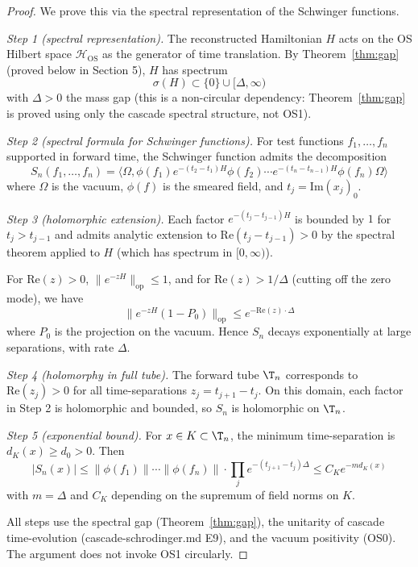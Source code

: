 \documentclass[11pt, a4paper]{amsart}
\theoremstyle{definition}
\newcommand{\HH}{\mathcal{H}}
\begin{document}
\begin{proof}
We prove this via the spectral representation of the Schwinger
functions.

\emph{Step 1 (spectral representation).}
The reconstructed Hamiltonian $H$ acts on the OS Hilbert space
$\HH_{\mathrm{OS}}$ as the generator of time translation.
By Theorem~\ref{thm:gap} (proved below in Section 5), $H$ has
spectrum
\[
\sigma(H) \subset \{0\} \cup [\Delta, \infty)
\]
with $\Delta > 0$ the mass gap (this is a non-circular dependency:
Theorem~\ref{thm:gap} is proved using only the cascade spectral
structure, not OS1).

\emph{Step 2 (spectral formula for Schwinger functions).}
For test functions $f_1, \dots, f_n$ supported in forward time,
the Schwinger function admits the decomposition
\[
S_n(f_1, \dots, f_n) = \langle \Omega, \phi(f_1) e^{-(t_2 - t_1) H} \phi(f_2) \cdots e^{-(t_n - t_{n-1}) H} \phi(f_n) \Omega \rangle
\]
where $\Omega$ is the vacuum, $\phi(f)$ is the smeared field,
and $t_j = \mathrm{Im}(x_j)_0$.

\emph{Step 3 (holomorphic extension).}
Each factor $e^{-(t_j - t_{j-1}) H}$ is bounded by $1$ for $t_j > t_{j-1}$
and admits analytic extension to $\mathrm{Re}(t_j - t_{j-1}) > 0$ by
the spectral theorem applied to $H$ (which has spectrum in $[0, \infty)$).

For $\mathrm{Re}(z) > 0$, $\|e^{-zH}\|_{\mathrm{op}} \leq 1$, and for
$\mathrm{Re}(z) > 1/\Delta$ (cutting off the zero mode), we have
\[
\|e^{-zH}(1 - P_0)\|_{\mathrm{op}} \leq e^{-\mathrm{Re}(z) \cdot \Delta}
\]
where $P_0$ is the projection on the vacuum. Hence $S_n$ decays
exponentially at large separations, with rate $\Delta$.

\emph{Step 4 (holomorphy in full tube).}
The forward tube $\T_n$ corresponds to $\mathrm{Re}(z_j) > 0$ for
all time-separations $z_j = t_{j+1} - t_j$. On this domain, each
factor in Step 2 is holomorphic and bounded, so $S_n$ is holomorphic
on $\T_n$.

\emph{Step 5 (exponential bound).}
For $x \in K \subset \T_n$, the minimum time-separation is
$d_K(x) \geq d_0 > 0$. Then
\[
|S_n(x)| \leq \|\phi(f_1)\| \cdots \|\phi(f_n)\| \cdot \prod_{j} e^{-(t_{j+1} - t_j) \Delta}
\leq C_K e^{-m d_K(x)}
\]
with $m = \Delta$ and $C_K$ depending on the supremum of field norms
on $K$.

All steps use the spectral gap (Theorem~\ref{thm:gap}), the unitarity
of cascade time-evolution (cascade-schrodinger.md E9), and the vacuum
positivity (OS0). The argument does not invoke OS1 circularly.
\end{proof}
\end{document}
